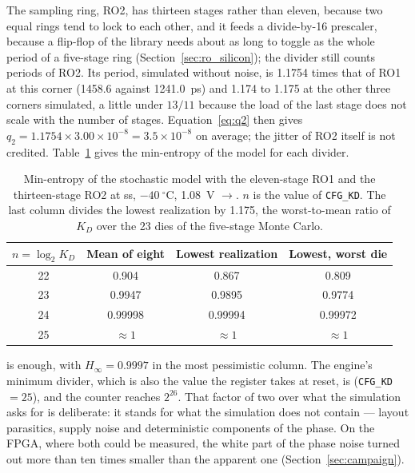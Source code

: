 The sampling ring, RO2, has thirteen stages rather than eleven, because
two equal rings tend to lock to each other, and it feeds a divide-by-16
prescaler, because a flip-flop of the library needs about as long to
toggle as the whole period of a five-stage ring \est{}
(Section~\ref{sec:ro_silicon}); the divider still counts periods of RO2. Its period, simulated without noise,
is 1.1754 times that of RO1 at this corner (1458.6 against 1241.0~ps) and
1.174 to 1.175 at the other three corners simulated, a little under
$13/11$ because the load of the last stage does not scale with the number
of stages. Equation~\eqref{eq:q2} then gives
$q_2 = 1.1754 \times 3.00\times10^{-8} = 3.5\times10^{-8}$ on average;
the jitter of RO2 itself is not credited. Table~\ref{tab:ihp_e11} gives
the min-entropy of the model for each divider.

\begin{table}[htbp]
\centering
\caption{Min-entropy of the stochastic model with the eleven-stage RO1
and the thirteen-stage RO2 at ss, $-40~^\circ$C, 1.08~V
\simu{}$\rightarrow$\est{}. $n$ is the value of \texttt{CFG\_KD}. The
last column divides the lowest realization by 1.175, the worst-to-mean
ratio of $K_D$ over the 23 dies of the five-stage Monte Carlo.}
\label{tab:ihp_e11}
\small
\begin{tabular}{@{}cccc@{}}
\toprule
$n = \log_2 K_D$ & Mean of eight & Lowest realization & Lowest, worst die \\
\midrule
22 & 0.904   & 0.867   & 0.809 \\
23 & 0.9947  & 0.9895  & 0.9774 \\
24 & 0.99998 & 0.99994 & 0.99972 \\
25 & $\approx 1$ & $\approx 1$ & $\approx 1$ \\
\bottomrule
\end{tabular}
\end{table}

 is enough, with $H_\infty = 0.9997$ in the most pessimistic
column. The engine's minimum divider, which is also the value the
register takes at reset, is  (\texttt{CFG\_KD} $= 25$), and the
counter reaches $2^{26}$. That factor of two over what the simulation
asks for is deliberate: it stands for what the simulation does not
contain --- layout parasitics, supply noise and deterministic components
of the phase. On the \ac{FPGA}, where both could be measured, the white
part of the phase noise turned out more than ten times smaller than the
apparent one (Section~\ref{sec:campaign}).

